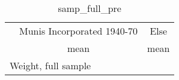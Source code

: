 \begin{table}[htbp]\centering
\def\sym#1{\ifmmode^{#1}\else\(^{#1}\)\fi}
\caption{samp\_full\_pre \label{tab1}}
\begin{tabular}{l*{2}{c}}
\toprule
                    &\multicolumn{1}{c}{Munis Incorporated 1940-70}&\multicolumn{1}{c}{Else}\\
                    &        mean&        mean\\
\midrule
\bottomrule
\multicolumn{3}{l}{\footnotesize Weight, full sample}\\
\end{tabular}
\end{table}
